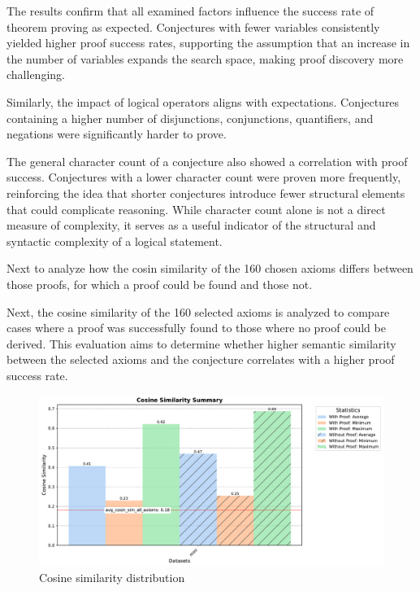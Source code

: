 \documentclass[english,version-2020-11]{uzl-thesis}
\begin{document}
The results confirm that all examined factors influence the success rate of theorem proving as expected. Conjectures with fewer variables consistently yielded higher proof success rates, supporting the assumption that an increase in the number of variables expands the search space, making proof discovery more challenging.

Similarly, the impact of logical operators aligns with expectations. Conjectures containing a higher number of disjunctions, conjunctions, quantifiers, and negations were significantly harder to prove.

The general character count of a conjecture also showed a correlation with proof success. Conjectures with a lower character count were proven more frequently, reinforcing the idea that shorter conjectures introduce fewer structural elements that could complicate reasoning. While character count alone is not a direct measure of complexity, it serves as a useful indicator of the structural and syntactic complexity of a logical statement.

Next to analyze how the cosin similarity of the 160 chosen axioms differs between those proofs, for which a proof could be found and those not.

Next, the cosine similarity of the 160 selected axioms is analyzed to compare cases where a proof was successfully found to those where no proof could be derived. This evaluation aims to determine whether higher semantic similarity between the selected axioms and the conjecture correlates with a higher proof success rate.

\begin{figure}[h!]
    \centering
    \includegraphics[width=\textwidth]{cosine_similarity_mini_noAdded_summary.pdf}
    \caption{Cosine similarity distribution}
    \label{fig:cosine_similarity}
\end{figure}
\FloatBarrier
\end{document}
